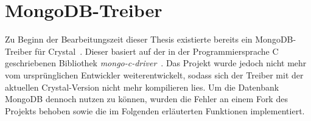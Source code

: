 \section{MongoDB-Treiber}
\label{sec:b_mongodb_treiber}

Zu Beginn der Bearbeitungszeit dieser Thesis existierte bereits ein
MongoDB-Treiber für Crystal~\cite{mongocr}.  Dieser basiert auf der in der
Programmiersprache C geschriebenen Bibliothek
\emph{mongo-c-driver}~\cite{libmongoc}.  Das Projekt wurde jedoch nicht mehr
vom ursprünglichen Entwickler weiterentwickelt, sodass sich der Treiber mit der
aktuellen Crystal-Version nicht mehr kompilieren lies.  Um die Datenbank MongoDB
dennoch nutzen zu können, wurden die Fehler an einem Fork des Projekts behoben
sowie die im Folgenden erläuterten Funktionen implementiert.




